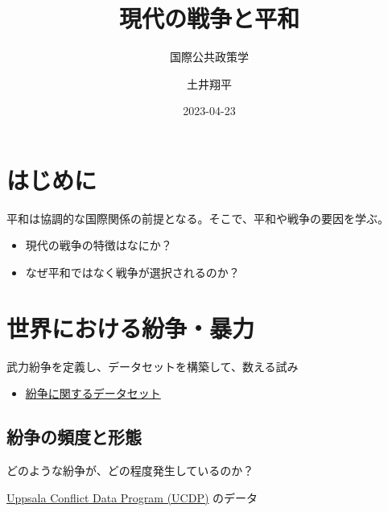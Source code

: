 \documentclass[
  xelatex,
  ja=standard]{bxjsarticle}
\title{現代の戦争と平和}
\subtitle{国際公共政策学}
\author{土井翔平}
\date{2023-04-23}
\providecommand{\tightlist}{%
  \setlength{\itemsep}{0pt}\setlength{\parskip}{0pt}}\usepackage{longtable,booktabs,array}
\begin{document}
\maketitle
\ifdefined\Shaded\renewenvironment{Shaded}{\begin{tcolorbox}[sharp corners, interior hidden, borderline west={3pt}{0pt}{shadecolor}, boxrule=0pt, breakable, frame hidden, enhanced]}{\end{tcolorbox}}\fi

\hypertarget{ux306fux3058ux3081ux306b}{%
\section*{はじめに}\label{ux306fux3058ux3081ux306b}}

平和は協調的な国際関係の前提となる。そこで、平和や戦争の要因を学ぶ。

\begin{itemize}
\tightlist
\item
  現代の戦争の特徴はなにか？
\item
  なぜ平和ではなく戦争が選択されるのか？
\end{itemize}

\hypertarget{ux4e16ux754cux306bux304aux3051ux308bux7d1bux4e89ux66b4ux529b}{%
\section{世界における紛争・暴力}\label{ux4e16ux754cux306bux304aux3051ux308bux7d1bux4e89ux66b4ux529b}}

武力紛争を定義し、データセットを構築して、数える試み\citep[序章]{tago2020}

\begin{itemize}
\tightlist
\item
  \href{https://www.cao.go.jp/pko/pko_j/organization/researcher/atpkonow/article099.html}{紛争に関するデータセット}
\end{itemize}

\hypertarget{ux7d1bux4e89ux306eux983bux5ea6ux3068ux5f62ux614b}{%
\subsection{紛争の頻度と形態}\label{ux7d1bux4e89ux306eux983bux5ea6ux3068ux5f62ux614b}}

どのような紛争が、どの程度発生しているのか？

\href{https://ucdp.uu.se/encyclopedia}{Uppsala Conflict Data Program
(UCDP)} のデータ\citep{gleditsch2002}
\end{document}
